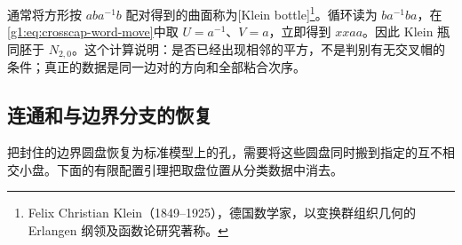 \begin{example}\label{g1:exm:klein-two-crosscaps}
	通常将方形按 \(aba^{-1}b\) 配对得到的曲面称为[Klein bottle]\footnote{Felix Christian Klein（1849--1925），德国数学家，以变换群组织几何的 Erlangen 纲领及函数论研究著称。}。循环读为 \(ba^{-1}ba\)，在\cref{g1:eq:crosscap-word-move}中取 \(U=a^{-1}\)、\(V=a\)，立即得到 \(xxaa\)。因此 Klein 瓶同胚于 \(N_{2,0}\)。这个计算说明：是否已经出现相邻的平方，不是判别有无交叉帽的条件；真正的数据是同一边对的方向和全部粘合次序。
\end{example}

\subsection{连通和与边界分支的恢复}
\label{g1:subsec:0604:04}

把封住的边界圆盘恢复为标准模型上的孔，需要将这些圆盘同时搬到指定的互不相交小盘。下面的有限配置引理把取盘位置从分类数据中消去。

